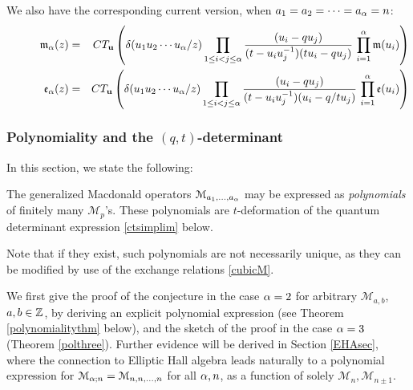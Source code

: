 We also have the corresponding current version, when $a_1=a_2=\cdots =a_{\alpha}=n$:
\begin{eqnarray}
\qquad\quad  {\mathfrak m}_{{\alpha}}(z)&=&CT_{\mathbf u}\left( \delta(u_1 u_2 \cdots u_{\alpha}/z) 
\prod_{1\leq i<j\leq {\alpha}} \frac{(u_i-q u_j)}{(t -u_i u_j^{-1})(t u_i-q u_j)}\, \prod_{i=1}^{\alpha} {\mathfrak m}(u_i)\right)\label{mbo}\\
\qquad\quad {\mathfrak e}_{{\alpha}}(z)&=&CT_{\mathbf u}\left( \delta(u_1 u_2 \cdots u_{\alpha}/z) 
\prod_{1\leq i<j\leq {\alpha}} \frac{(u_i-q u_j)}{(t -u_i u_j^{-1})(u_i-q/t u_j)}\, \prod_{i=1}^{\alpha} {\mathfrak e}(u_i)\right)\label{ebo}
\end{eqnarray}

\subsubsection{Polynomiality and the $(q,t)$-determinant}

In this section, we state the following:

\begin{conj}\label{polyconj}
The generalized Macdonald operators ${\mathcal M}_{a_1,...,a_{\alpha}}$ may be expressed as {\it polynomials} of 
finitely many ${\mathcal M}_{p}$'s. These polynomials are $t$-deformation of the quantum determinant expression \eqref{ctsimplim} below.
\end{conj}

Note that if they exist, such polynomials are not necessarily unique, as they can be modified 
by use of the exchange relations \eqref{cubicM}.


We first give the proof of the conjecture in the case ${\alpha}=2$ for arbitrary ${\mathcal M}_{a,b}$, $a,b\in {\mathbb Z}$,
by deriving an explicit polynomial expression (see Theorem \ref{polynomialitythm} below), and the sketch 
of the proof in the case ${\alpha}=3$ (Theorem \ref{polthree}). 
Further evidence will be derived in Section \ref{EHAsec}, where the connection to Elliptic Hall 
algebra leads naturally to a polynomial expression for 
${\mathcal M}_{{\alpha};n}={\mathcal M}_{n,n,...,n}$ for all ${\alpha},n$, as a function of solely 
${\mathcal M}_n,{\mathcal M}_{n\pm 1}$.

